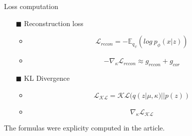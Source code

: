   \begin{frame}{Loss computation}

    \begin{itemize}
      \item[$\blacksquare$] Reconstruction loss
        \begin{itemize}
          \item $$\mathcal{L}_{recon} =  - \mathbb{E}_{q_{\psi}}( log\ p_{\phi}(x | z)) $$
          \item$$ -\nabla_{\kappa} \mathcal{L}_{recon} \approx g_{recon} + g_{cor} $$ 
        \end{itemize}
      \item[$\blacksquare$] KL Divergence 
          \begin{itemize}
            \item $$ \mathcal{L}_{\mathcal{KL}} = \mathcal{KL}(q(z|\mu, \kappa) || p(z)) $$
            \item $$ \nabla_{\kappa} \mathcal{L}_{\mathcal{KL}} $$
          \end{itemize}
    \end{itemize}
    The formulas were explicity computed in the article.
    
  \end{frame}